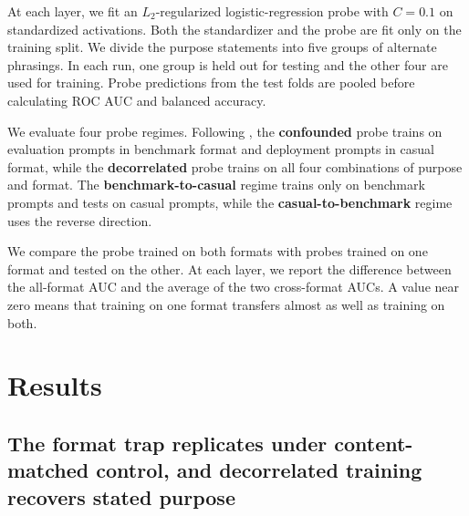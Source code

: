 \documentclass{article}
\begin{document}
At each layer, we fit an $L_2$-regularized logistic-regression probe
with $C=0.1$ on standardized activations. Both the standardizer and the
probe are fit only on the training split. We divide the purpose statements into five groups of alternate phrasings. In each run, one group is held out for testing and the other four are used for training. Probe predictions from the test folds are pooled  before calculating ROC AUC and balanced accuracy.

We evaluate four probe regimes. Following \citet{devbunova2026format}, the \textbf{confounded} probe trains on
evaluation prompts in benchmark format and deployment prompts in
casual format, while the \textbf{decorrelated} probe trains on all four combinations of purpose and format. 
The \textbf{benchmark-to-casual} regime trains only on benchmark prompts and tests on casual prompts, while the \textbf{casual-to-benchmark} regime uses the reverse direction. 

We compare the probe trained on both formats with probes trained on one format and tested on the other. At each layer, we report the difference between the all-format AUC and the average of the two cross-format AUCs. A value near zero means that training on one format transfers almost as well as training on both. 










\section{Results}
\label{sec:results}




\subsection{The format trap replicates under content-matched control, and
decorrelated training recovers stated purpose}
\label{sec:results_replication}
\end{document}
